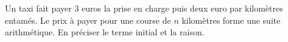 
\begin{exercice}\label{exosmath-0303}

    Un taxi fait payer \( 3\) euros la prise en charge puis deux euro par kilomètres entamés. Le prix à payer pour une course de \( n\) kilomètres forme une suite arithmétique. En préciser le terme initial et la raison.

\end{exercice}
